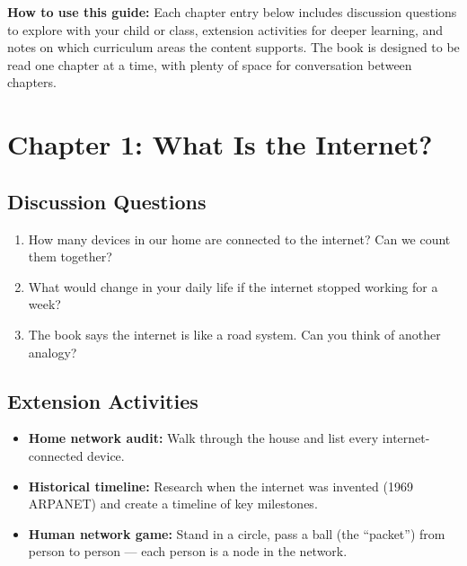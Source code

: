 



\begin{tcolorbox}[enhanced,colback=LightGray,colframe=InternetBlue!50,arc=6pt,boxrule=1pt,
  left=10pt,right=10pt,top=10pt,bottom=10pt]
\textbf{How to use this guide:}
Each chapter entry below includes discussion questions to explore with your child or class,
extension activities for deeper learning, and notes on which curriculum areas the content supports.
The book is designed to be read one chapter at a time, with plenty of space for conversation between chapters.
\end{tcolorbox}

\vspace{12pt}

\section*{Chapter 1: What Is the Internet?}

\subsection*{Discussion Questions}
\begin{enumerate}
  \item How many devices in our home are connected to the internet? Can we count them together?
  \item What would change in your daily life if the internet stopped working for a week?
  \item The book says the internet is like a road system. Can you think of another analogy?
\end{enumerate}

\subsection*{Extension Activities}
\begin{itemize}
  \item \textbf{Home network audit:} Walk through the house and list every internet-connected device.
  \item \textbf{Historical timeline:} Research when the internet was invented (1969 ARPANET) and create a timeline of key milestones.
  \item \textbf{Human network game:} Stand in a circle, pass a ball (the ``packet'') from person to person — each person is a node in the network.
\end{itemize}


